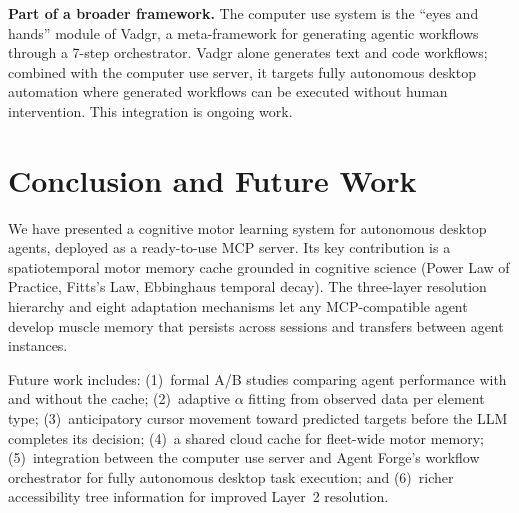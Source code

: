 \documentclass[conference]{IEEEtran}
\begin{document}
\textbf{Part of a broader framework.} The computer use system is the ``eyes and hands'' module of Vadgr, a meta-framework for generating agentic workflows through a 7-step orchestrator. Vadgr alone generates text and code workflows; combined with the computer use server, it targets fully autonomous desktop automation where generated workflows can be executed without human intervention. This integration is ongoing work.

\section{Conclusion and Future Work}

We have presented a cognitive motor learning system for autonomous desktop agents, deployed as a ready-to-use MCP server. Its key contribution is a spatiotemporal motor memory cache grounded in cognitive science (Power Law of Practice, Fitts's Law, Ebbinghaus temporal decay). The three-layer resolution hierarchy and eight adaptation mechanisms let any MCP-compatible agent develop muscle memory that persists across sessions and transfers between agent instances.

Future work includes: (1)~formal A/B studies comparing agent performance with and without the cache; (2)~adaptive $\alpha$ fitting from observed data per element type; (3)~anticipatory cursor movement toward predicted targets before the LLM completes its decision; (4)~a shared cloud cache for fleet-wide motor memory; (5)~integration between the computer use server and Agent Forge's workflow orchestrator for fully autonomous desktop task execution; and (6)~richer accessibility tree information for improved Layer~2 resolution.



\end{document}
